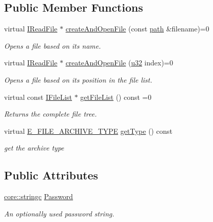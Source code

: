 \subsection*{Public Member Functions}
\begin{DoxyCompactItemize}
\item 
virtual \hyperlink{classirr_1_1io_1_1IReadFile}{I\+Read\+File} $\ast$ \hyperlink{classirr_1_1io_1_1IFileArchive_a5c3b4994ae63447d2634dd86b3069988}{create\+And\+Open\+File} (const \hyperlink{namespaceirr_1_1io_ab1bdc45edb3f94d8319c02bc0f840ee1}{path} \&filename)=0
\begin{DoxyCompactList}\small\item\em Opens a file based on its name. \end{DoxyCompactList}\item 
virtual \hyperlink{classirr_1_1io_1_1IReadFile}{I\+Read\+File} $\ast$ \hyperlink{classirr_1_1io_1_1IFileArchive_ab6bc8fbd660bbbe42b4d30a9d4f26c7d}{create\+And\+Open\+File} (\hyperlink{namespaceirr_a0416a53257075833e7002efd0a18e804}{u32} index)=0
\begin{DoxyCompactList}\small\item\em Opens a file based on its position in the file list. \end{DoxyCompactList}\item 
virtual const \hyperlink{classirr_1_1io_1_1IFileList}{I\+File\+List} $\ast$ \hyperlink{classirr_1_1io_1_1IFileArchive_a5e7068953cabaaa0c02930cdf5bea97c}{get\+File\+List} () const  =0
\begin{DoxyCompactList}\small\item\em Returns the complete file tree. \end{DoxyCompactList}\item 
virtual \hyperlink{namespaceirr_1_1io_adb3e3c445ec8e608ed1f0f93306da14f}{E\+\_\+\+F\+I\+L\+E\+\_\+\+A\+R\+C\+H\+I\+V\+E\+\_\+\+T\+Y\+PE} \hyperlink{classirr_1_1io_1_1IFileArchive_acffb15450606924696fb8f9608819536}{get\+Type} () const \hypertarget{classirr_1_1io_1_1IFileArchive_acffb15450606924696fb8f9608819536}{}\label{classirr_1_1io_1_1IFileArchive_acffb15450606924696fb8f9608819536}

\begin{DoxyCompactList}\small\item\em get the archive type \end{DoxyCompactList}\end{DoxyCompactItemize}
\subsection*{Public Attributes}
\begin{DoxyCompactItemize}
\item 
\hyperlink{namespaceirr_1_1core_ade1071a878633f2f6d8a75c5d11fec19}{core\+::stringc} \hyperlink{classirr_1_1io_1_1IFileArchive_ae5b574864226b09c70518e163e59b6ba}{Password}
\begin{DoxyCompactList}\small\item\em An optionally used password string. \end{DoxyCompactList}\end{DoxyCompactItemize}
